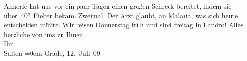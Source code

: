 \begin{ledgroupsized}[t]{13cm}
           \pstart
           Annerle hat uns vor ein paar Tagen einen
               großen Schreck bereitet, indem sie über 40° Fieber bekam. Zweimal. Der Arzt glaubt, an Malaria, was
               sich heute entscheiden müßte.\pend
           \pstart
           Wir reisen Donnerstag{ }früh und sind freitag in Landro!\pend
           \pstart
           Alles herzliche von uns zu Ihnen {\\[\baselineskip]}Ihr {\\[\baselineskip]}\spacefill\mbox{Salten}\pend
           \leftskip=0em{}\pstart
           Grado, 12. Juli 09\pend
           
         
         \endnumbering{}\end{ledgroupsized}  \newcommand{\dateiname}{L03502}\newcommand{\titel}{Felix Salten an Arthur Schnitzler, 12. 7. 1909}\newcommand{\editorInnen}{Martin Anton Müller und Laura Untner}
      